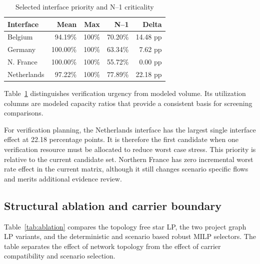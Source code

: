 \documentclass{ieeeaccess}
\begin{document}
\begin{table}[t]
\centering
\caption{Selected interface priority and N--1 criticality}
\label{tab:priority}
\scriptsize
\setlength{\tabcolsep}{2.5pt}
\begin{tabular}{@{}lrrrr@{}}
\toprule
Interface & Mean & Max & N--1 & Delta \\
\midrule
Belgium & 94.19\% & 100\% & 70.20\% & 14.48 pp \\
Germany & 100.00\% & 100\% & 63.34\% & 7.62 pp \\
N. France & 100.00\% & 100\% & 55.72\% & 0.00 pp \\
Netherlands & 97.22\% & 100\% & 77.89\% & 22.18 pp \\
\bottomrule
\end{tabular}
\end{table}

Table~\ref{tab:priority} distinguishes verification urgency from modeled volume. Its utilization columns are modeled capacity ratios that provide a consistent basis for screening comparisons.

For verification planning, the Netherlands interface has the largest single interface effect at 22.18 percentage points. It is therefore the first candidate when one verification resource must be allocated to reduce worst case stress. This priority is relative to the current candidate set. Northern France has zero incremental worst rate effect in the current matrix, although it still changes scenario specific flows and merits additional evidence review.

\subsection{Structural ablation and carrier boundary}

Table~\ref{tab:ablation} compares the topology free star LP, the two project graph LP variants, and the deterministic and scenario based robust MILP selectors. The table separates the effect of network topology from the effect of carrier compatibility and scenario selection.
\end{document}

